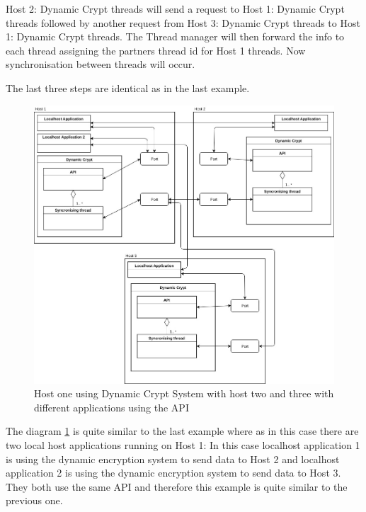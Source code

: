 Host 2: Dynamic Crypt threads will send a request to Host 1: Dynamic Crypt threads followed by another request from Host 3: Dynamic Crypt threads to Host 1: Dynamic Crypt threads. The Thread manager will then forward the info to each thread assigning the partners thread id for Host 1 threads. Now synchronisation between threads will occur.

The last three steps are identical as in the last example.



\begin{figure}[!h]
  \centering
      \includegraphics[width=1\textwidth]{Figures/basic-3hosts-2apps.jpg}
  \caption[Host one using Dynamic Crypt System with host two and three with different applications using the API]{Host one using Dynamic Crypt System with host two and three with different applications using the API}
  \label{fig:3hostsbasic2apps}
\end{figure}

\FloatBarrier

The diagram \ref{fig:3hostsbasic2apps} is quite similar to the last example where as in this case there are two local host applications running on Host 1: In this case localhost application 1 is using the dynamic encryption system to send data to Host 2 and localhost application 2 is using the dynamic encryption system to send data to Host 3. They both use the same API and therefore this example is quite similar to the previous one.


